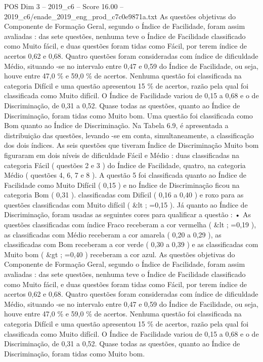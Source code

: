 \begin{textsample}{POS Dim 3 – 2019\_c6 – Score 16.00 – 2019\_c6/enade\_2019\_eng\_prod\_c7c0e9871a.txt}
As questões objetivas do Componente de Formação Geral, segundo o Índice de Facilidade, foram assim avaliadas : das sete questões, nenhuma teve o Índice de Facilidade classificado como Muito fácil, e duas questões foram tidas como Fácil, por terem índice de acertos 0,62 e 0,68.
Quatro questões foram consideradas com índice de dificuldade Médio, situando -se no intervalo entre 0,47 e 0,59 do Índice de Facilidade, ou seja, houve entre 47,0 \% e 59,0 \% de acertos.
Nenhuma questão foi classificada na categoria Difícil e uma questão apresentou 15 \% de acertos, razão pela qual foi classificada como Muito difícil.
O Índice de Facilidade variou de 0,15 a 0,68 e o de Discriminação, de 0,31 a 0,52.
Quase todas as questões, quanto ao Índice de Discriminação, foram tidas como Muito bom.
Uma questão foi classificada como Bom quanto ao Índice de Discriminação.
Na Tabela 6.9, é apresentada a distribuição das questões, levando -se em conta, simultaneamente, a classificação dos dois índices.
As seis questões que tiveram Índice de Discriminação Muito bom figuraram em dois níveis de dificuldade Fácil e Médio : duas classificadas na categoria Fácil ( questões 2 e 3 ) do Índice de Facilidade, quatro, na categoria Médio ( questões 4, 6, 7 e 8 ).
A questão 5 foi classificada quanto ao Índice de Facilidade como Muito Difícil ( 0,15 ) e no Índice de Discriminação ficou na categoria Bom ( 0,31 ). classificadas com Difícil ( 0,16 a 0,40 ) e roxo para as questões classificadas com Muito difícil ( \&lt ; =0,15 ).
Já quanto ao Índice de Discriminação, foram usadas as seguintes cores para qualificar a questão : • As questões classificadas com índice Fraco receberam a cor vermelha ( \&lt ; =0,19 ), as classificadas com Médio receberam a cor amarela ( 0,20 a 0,29 ), as classificadas com Bom receberam a cor verde ( 0,30 a 0,39 ) e as classificadas com Muito bom ( \&gt ; =0,40 ) receberam a cor azul.
As questões objetivas do Componente de Formação Geral, segundo o Índice de Facilidade, foram assim avaliadas : das sete questões, nenhuma teve o Índice de Facilidade classificado como Muito fácil, e duas questões foram tidas como Fácil, por terem índice de acertos 0,62 e 0,68.
Quatro questões foram consideradas com índice de dificuldade Médio, situando -se no intervalo entre 0,47 e 0,59 do Índice de Facilidade, ou seja, houve entre 47,0 \% e 59,0 \% de acertos.
Nenhuma questão foi classificada na categoria Difícil e uma questão apresentou 15 \% de acertos, razão pela qual foi classificada como Muito difícil.
O Índice de Facilidade variou de 0,15 a 0,68 e o de Discriminação, de 0,31 a 0,52.
Quase todas as questões, quanto ao Índice de Discriminação, foram tidas como Muito bom.

\end{textsample}
